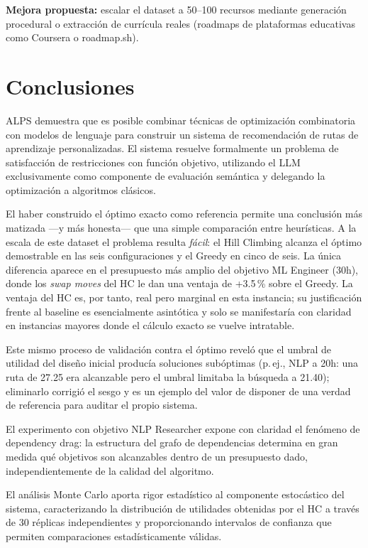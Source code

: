 \documentclass[11pt, a4paper]{article}
\begin{document}
\begin{notebox}
\textbf{Mejora propuesta:} escalar el dataset a 50–100 recursos mediante generación procedural o extracción de currícula reales (roadmaps de plataformas educativas como Coursera o roadmap.sh).
\end{notebox}

\section{Conclusiones}

ALPS demuestra que es posible combinar técnicas de optimización combinatoria con modelos de lenguaje para construir un sistema de recomendación de rutas de aprendizaje personalizadas. El sistema resuelve formalmente un problema de satisfacción de restricciones con función objetivo, utilizando el LLM exclusivamente como componente de evaluación semántica y delegando la optimización a algoritmos clásicos.

El haber construido el óptimo exacto como referencia permite una conclusión más matizada —y más honesta— que una simple comparación entre heurísticas. A la escala de este dataset el problema resulta \emph{fácil}: el Hill Climbing alcanza el óptimo demostrable en las seis configuraciones y el Greedy en cinco de seis. La única diferencia aparece en el presupuesto más amplio del objetivo ML Engineer (30h), donde los \emph{swap moves} del HC le dan una ventaja de +3.5\,\% sobre el Greedy. La ventaja del HC es, por tanto, real pero marginal en esta instancia; su justificación frente al baseline es esencialmente asintótica y solo se manifestaría con claridad en instancias mayores donde el cálculo exacto se vuelve intratable.

Este mismo proceso de validación contra el óptimo reveló que el umbral de utilidad del diseño inicial producía soluciones subóptimas (p.\,ej., NLP a 20h: una ruta de 27.25 era alcanzable pero el umbral limitaba la búsqueda a 21.40); eliminarlo corrigió el sesgo y es un ejemplo del valor de disponer de una verdad de referencia para auditar el propio sistema.

El experimento con objetivo NLP Researcher expone con claridad el fenómeno de dependency drag: la estructura del grafo de dependencias determina en gran medida qué objetivos son alcanzables dentro de un presupuesto dado, independientemente de la calidad del algoritmo.

El análisis Monte Carlo aporta rigor estadístico al componente estocástico del sistema, caracterizando la distribución de utilidades obtenidas por el HC a través de 30 réplicas independientes y proporcionando intervalos de confianza que permiten comparaciones estadísticamente válidas.
\end{document}
